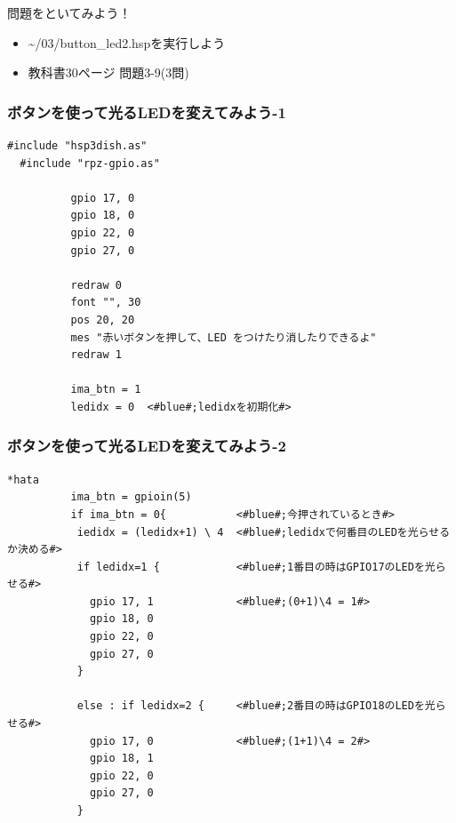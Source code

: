 \begin{frame}
  \begin{exampleblock}{問題をといてみよう！}
    \begin{itemize}
      \item \sim/03/button\_led2.hspを実行しよう
      \item 教科書30ページ 問題3-9(3問)
    \end{itemize}
  \end{exampleblock} 
\end{frame}

\begin{frame}[fragile]
  \frametitle{ボタンを使って光るLEDを変えてみよう-1}
  \begin{lstlisting}[title=\sim/03/button\_led3.hsp 前半, label=button_led3.hsp-1]
  #include "hsp3dish.as"
  #include "rpz-gpio.as"
  
          gpio 17, 0   
          gpio 18, 0
          gpio 22, 0
          gpio 27, 0

          redraw 0
          font "", 30
          pos 20, 20
          mes "赤いボタンを押して、LED をつけたり消したりできるよ"
          redraw 1

          ima_btn = 1 
          ledidx = 0  <#blue#;ledidxを初期化#>
  \end{lstlisting}
\end{frame}

\begin{frame}[fragile]
  \frametitle{ボタンを使って光るLEDを変えてみよう-2}
  \begin{lstlisting}[title=\sim/03/button\_led3.hsp 中盤, label=button_led3.hsp-2]
  *hata
          ima_btn = gpioin(5)
          if ima_btn = 0{           <#blue#;今押されているとき#>
           iedidx = (ledidx+1) \ 4  <#blue#;ledidxで何番目のLEDを光らせるか決める#>
           if ledidx=1 {            <#blue#;1番目の時はGPIO17のLEDを光らせる#>
             gpio 17, 1             <#blue#;(0+1)\4 = 1#>
             gpio 18, 0 
             gpio 22, 0
             gpio 27, 0
           }

           else : if ledidx=2 {     <#blue#;2番目の時はGPIO18のLEDを光らせる#>
             gpio 17, 0             <#blue#;(1+1)\4 = 2#>
             gpio 18, 1
             gpio 22, 0
             gpio 27, 0
           }
  \end{lstlisting}
\end{frame}

